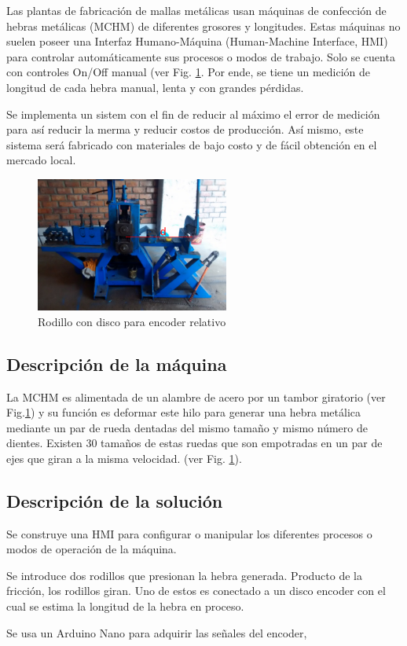 \documentclass[main_conf.tex]{subfiles}
\begin{document}
Las plantas de fabricación de mallas metálicas usan máquinas de
confección de hebras metálicas (MCHM) de diferentes grosores y
longitudes. Estas máquinas no suelen poseer una Interfaz
Humano-Máquina (Human-Machine Interface, HMI) para controlar
automáticamente sus procesos o modos de trabajo. Solo se 
cuenta con controles On/Off manual (ver Fig.
\ref{maquina_a_automatizar}. Por ende, se tiene un medición de
longitud de cada hebra manual, lenta y con grandes pérdidas.

Se implementa un sistem con el fin de reducir al máximo el
error de medición para así reducir la merma y reducir costos de
producción. Así mismo, este sistema será fabricado con materiales
de bajo costo y de fácil obtención en el mercado local.

\begin{figure}[h]
  \centering
  \includegraphics[width=2.5in]{../img/distancia_inicial.png}
  \caption{Rodillo con disco para encoder relativo}
  \label{maquina_a_automatizar}
\end{figure}

\subsection{Descripción de la máquina}
La MCHM es alimentada de un alambre de acero por un tambor
giratorio (ver Fig.\ref{maquina_a_automatizar}) y su función es
deformar este hilo para generar una hebra metálica mediante un
par de rueda dentadas del mismo tamaño y mismo número de dientes.
Existen 30 tamaños de estas ruedas que son empotradas en un par
de ejes que giran a la misma velocidad. (ver Fig.
\ref{maquina_a_automatizar}).

\subsection{Descripción de la solución}
Se construye una HMI para configurar o manipular los  diferentes procesos o modos
de operación de la máquina.

Se introduce dos rodillos que presionan la hebra generada. Producto de
la fricción, los rodillos giran. Uno de estos es conectado a un disco
encoder con el cual se estima la longitud de la hebra en proceso.

Se usa un Arduino Nano para adquirir las señales del encoder,
\end{document}
